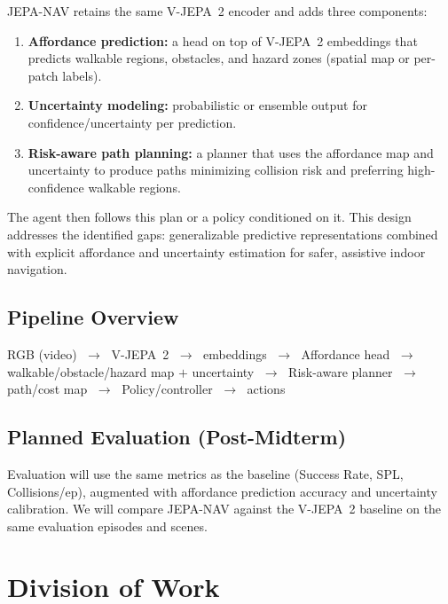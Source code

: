 \documentclass{article}
\begin{document}
JEPA-NAV retains the same V-JEPA~2 encoder and adds three components:
\begin{enumerate}
  \item \textbf{Affordance prediction:} a head on top of V-JEPA~2 embeddings that
        predicts walkable regions, obstacles, and hazard zones (spatial map or
        per-patch labels).
  \item \textbf{Uncertainty modeling:} probabilistic or ensemble output for
        confidence/uncertainty per prediction.
  \item \textbf{Risk-aware path planning:} a planner that uses the affordance map and
        uncertainty to produce paths minimizing collision risk and preferring
        high-confidence walkable regions.
\end{enumerate}

\noindent
The agent then follows this plan or a policy conditioned on it. This design addresses
the identified gaps: generalizable predictive representations combined with explicit
affordance and uncertainty estimation for safer, assistive indoor navigation.

\subsection{Pipeline Overview}

\begin{center}
RGB (video)
$\;\to\;$ V-JEPA~2
$\;\to\;$ embeddings
$\;\to\;$ Affordance head
$\;\to\;$ walkable/obstacle/hazard map $+$ uncertainty
$\;\to\;$ Risk-aware planner
$\;\to\;$ path/cost map
$\;\to\;$ Policy/controller
$\;\to\;$ actions
\end{center}

\subsection{Planned Evaluation (Post-Midterm)}

Evaluation will use the same metrics as the baseline (Success Rate, SPL,
Collisions/ep), augmented with affordance prediction accuracy and uncertainty
calibration. We will compare JEPA-NAV against the V-JEPA~2 baseline on the same
evaluation episodes and scenes.

\section{Division of Work}
\end{document}
